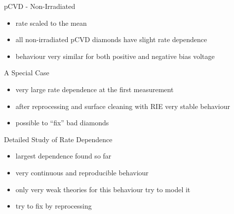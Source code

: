 \begin{frame}{pCVD - Non-Irradiated}
 
	
	
	\begin{itemize} \itemfill
		\item rate scaled to the mean
		\item all non-irradiated pCVD diamonds have slight rate dependence
		\item behaviour very similar for both positive and negative bias voltage
	\end{itemize}
 
\end{frame}
\begin{frame}{A Special Case}

	
	\begin{itemize}\itemfill
		\item very large rate dependence at the first measurement
		\item after reprocessing and surface cleaning with RIE very stable behaviour
		\item possible to ``fix'' bad diamonds
	\end{itemize}

\end{frame}
\begin{frame}{Detailed Study of Rate Dependence}

	\vspace*{-15pt}\vspace*{-5pt}
	
	\begin{itemize}\itemfill
		\item largest dependence found so far
		\item very continuous and reproducible behaviour
		\item only very weak theories for this behaviour \ra try to model it
		\item try to fix by reprocessing
	\end{itemize}

\end{frame}
